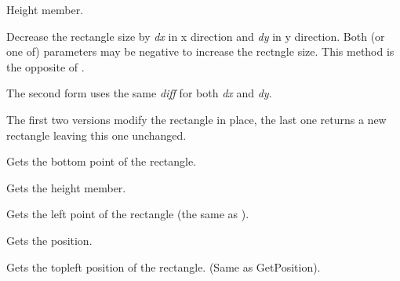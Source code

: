 
Height member.

\label{wxrectdeflate}




Decrease the rectangle size by {\it dx} in x direction and {\it dy} in y
direction. Both (or one of) parameters may be negative to increase the
rectngle size. This method is the opposite of .

The second form uses the same {\it diff} for both {\it dx} and {\it dy}.

The first two versions modify the rectangle in place, the last one returns a
new rectangle leaving this one unchanged.



\label{wxrectgetbottom}


Gets the bottom point of the rectangle.

\label{wxrectgetheight}


Gets the height member.

\label{wxrectgetleft}


Gets the left point of the rectangle (the same as ).

\label{wxrectgetposition}


Gets the position.

\label{wxrectgettopleft}


Gets the topleft position of the rectangle. (Same as GetPosition).

\label{wxrectgetbottomright}

